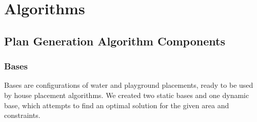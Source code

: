 \documentclass{article}
\begin{document}
\section{Algorithms}

\subsection{Plan Generation Algorithm Components}

\begin{table}[H]
\centering
\caption{Algorithm Components, where 'TRUE' indicates features}
\label{algorithm-components}
\end{table}

\iffalse
\subsubsection{Groundplan}

Groundplan simply produces an empty plan, where everything is place
\fi

\subsubsection{Bases}
Bases are configurations of water and playground placements, ready to be used by house placement algorithms. We created two static bases and one dynamic base, which attempts to find an optimal solution for the given area and constraints.
\end{document}
